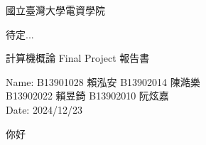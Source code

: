 \documentclass{report}					%
\begin{document}



\begin{titlepage} 						%
\centering								%

\vspace*{\fill}							%

\huge{國立臺灣大學電資學院}\\		%
\vspace{1 cm}

\LARGE{待定...}
\vspace{2 cm}

\begin{mdframed}						%
\centering
\LARGE{計算機概論 Final Project 報告書}
\end{mdframed}

\vspace{3 cm}

\begin{flushleft}
\large{Name: B13901028 賴泓安 B13902014 陳澔樂\\ B13902022 賴昱錡 B13902010 阮炫嘉\\	Date: 2024/12/23\\}

\vspace*{\fill}	

\end{flushleft}
\end{titlepage}							%


你好
\end{document}
